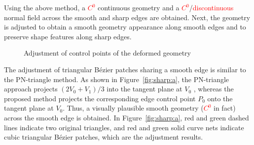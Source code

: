 \documentclass[3p]{elsarticle}
\begin{document}
Using the above method, a \textcolor{red}{$C^0$} continuous geometry and a
\textcolor{red}{$C^0$}/\textcolor{red}{discontinuous} normal field across the smooth and sharp edges are obtained. Next,
the geometry is adjusted to obtain a smooth geometry appearance along smooth edges and to preserve shape features along
sharp edges.

\begin{figure}
		\centering
		\caption{Adjustment of control points of the deformed geometry}
		\label{fig:sharp}
\end{figure}

The adjustment of triangular B\'ezier patches sharing a smooth edge is similar to the PN-triangle method. As shown in
Figure~\ref{fig:sharp:a}, the PN-triangle approach projects $(2V_0+V_1)/3$ into the tangent plane at $V_0$
\cite{Vlachos01}, whereas the proposed method projects the corresponding edge control point $P_0$ onto the tangent plane
at $V_0$. Thus, a visually plausible smooth geometry (\textcolor{red}{$C^0$} in fact) across the smooth edge is
obtained. In Figure~\ref{fig:sharp:a}, red and green dashed lines indicate two original triangles, and red and green
solid curve nets indicate cubic triangular B\'ezier patches, which are the adjustment results.
\end{document}
